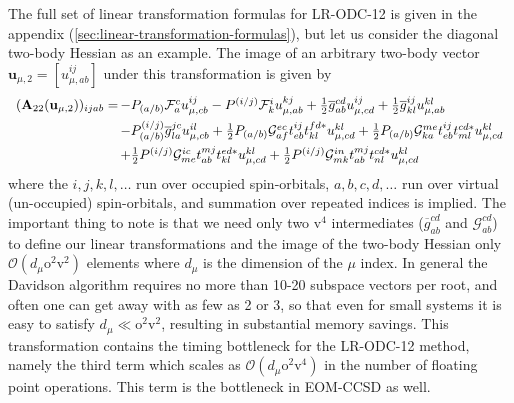 The full set of linear transformation formulas for LR-ODC-12 is given in the
appendix (\cref{sec:linear-transformation-formulas}), but let us consider the
diagonal two-body Hessian as an example.
The image of an arbitrary two-body vector
\(
    \mathbf{u}_{\mu,2}
    =
    [u_{\mu,ab}^{ij}]
\)
under this transformation is given by
\begin{equation}
    \begin{array}{r@{\,}l}
        (\mathbf{A}_{22}(\mathbf{u}_{\mu,2}))_{ijab}
        =
        &
        -
        P_{(a/b)}
        \mathcal{F}_a^c
        u_{\mu,cb}^{ij}
        -
        P^{(i/j)}
        \mathcal{F}_k^i
        u_{\mu,ab}^{kj}
        +
        \tfrac{1}{2}
        \overline{g}_{ab}^{cd}
        u_{\mu,cd}^{ij}
        +
        \tfrac{1}{2}
        \overline{g}_{kl}^{ij}
        u_{\mu,ab}^{kl}
        \\[5pt]
        &
        -
        P_{(a/b)}^{(i/j)}
        \overline{g}_{la}^{jc}
        u_{\mu,cb}^{il}
        +
        \tfrac{1}{2}
        P_{(a/b)}
        \mathcal{G}_{af}^{ec}
        t_{eb}^{ij}
        t_{kl}^{fd*}
        u_{\mu,cd}^{kl}
        +
        \tfrac{1}{2}
        P_{(a/b)}
        \mathcal{G}_{ka}^{me}
        t_{eb}^{ij}
        t_{ml}^{cd*}
        u_{\mu,cd}^{kl}
        \\[5pt]
        &
        +
        \tfrac{1}{2}
        P^{(i/j)}
        \mathcal{G}_{me}^{ic}
        t_{ab}^{mj}
        t_{kl}^{ed*}
        u_{\mu,cd}^{kl}
        +
        \tfrac{1}{2}
        P^{(i/j)}
        \mathcal{G}_{mk}^{in}
        t_{ab}^{mj}
        t_{nl}^{cd*}
        u_{\mu,cd}^{kl}
    \end{array}
\end{equation}
where the \(i,j,k,l,\ldots\) run over occupied spin-orbitals, \(a,b,c,d,\ldots\)
run over virtual (un-occupied) spin-orbitals, and summation over repeated
indices is implied.
The important thing to note is that we need only two \(\mathrm{v}^4\)
intermediates (\(\overline{g}_{ab}^{cd}\) and \(\mathcal{G}_{ab}^{cd}\)) to
define our linear transformations and the image of the two-body Hessian only
\(\mathcal{O}(d_\mu\mathrm{o}^2\mathrm{v}^2)\) elements where \(d_\mu\) is the
dimension of the \(\mu\) index.
In general the Davidson algorithm requires no more than 10-20 subspace vectors
per root, and often one can get away with as few as 2 or 3, so that even for
small systems it is easy to satisfy
\(
    d_\mu \ll \mathrm{o}^2\mathrm{v}^2
\),
resulting in substantial memory savings.
This transformation contains the timing bottleneck for the LR-ODC-12 method,
namely the third term which scales as
\(\mathcal{O}(d_\mu\mathrm{o}^2\mathrm{v}^4)\)
in the number of floating point operations.
This term is the bottleneck in EOM-CCSD as well.


